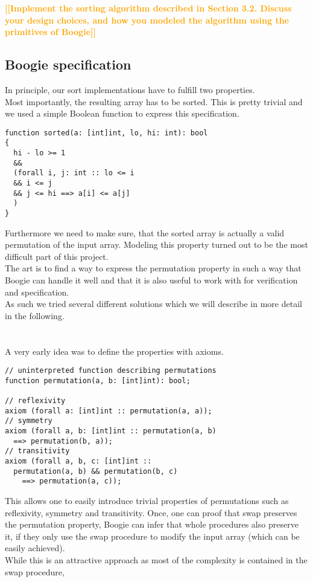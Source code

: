 \documentclass{report}
\newcommand{\todo}[1]{\textsf{\textbf{\textcolor{orange}{[[#1]]}}}}
\begin{document}
\todo{Implement the sorting algorithm described in
Section 3.2. Discuss your design choices, and how you modeled the algorithm using the
primitives of Boogie}

\subsection{Boogie specification}
In principle, our sort implementations have to fulfill two properties.\\
Most importantly, the resulting array has to be sorted. This is pretty trivial and we used
a simple Boolean function to express this specification.
\begin{lstlisting}
function sorted(a: [int]int, lo, hi: int): bool
{
  hi - lo >= 1
  &&
  (forall i, j: int :: lo <= i 
  && i <= j 
  && j <= hi ==> a[i] <= a[j]
  )
}
\end{lstlisting}
Furthermore we need to make sure, that the sorted array is actually a valid
permutation of the input array. Modeling this property turned out to be the most difficult part
of this project.\\
The art is to find a way to express the permutation property in such a way that
Boogie can handle it well and that it is also useful to work with for verification
and specification.\\
As such we tried several different solutions which we will describe in more detail
in the following.\\
\\
\\
A very early idea was to define the properties with axioms.
\begin{lstlisting}
// uninterpreted function describing permutations
function permutation(a, b: [int]int): bool;

// reflexivity
axiom (forall a: [int]int :: permutation(a, a));
// symmetry
axiom (forall a, b: [int]int :: permutation(a, b)
  ==> permutation(b, a));
// transitivity
axiom (forall a, b, c: [int]int ::
  permutation(a, b) && permutation(b, c)
    ==> permutation(a, c));
\end{lstlisting}
This allows one to easily introduce trivial properties of permutations such as
reflexivity, symmetry and transitivity. Once, one can proof that swap preserves
the permutation property, Boogie can infer that whole procedures also preserve
it, if they only use the swap procedure to modify the input array (which can be easily achieved).\\
While this is an attractive approach as most of the complexity is contained in the swap procedure,
\end{document}
